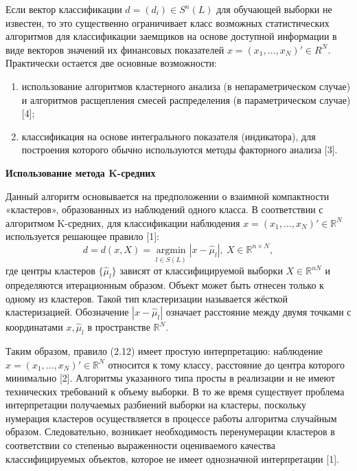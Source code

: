 \documentclass[14pt,a4paper]{extarticle}
\begin{document}
Если вектор классификации $d = (d_{i}) \in S^{n}(L)$ для обучающей выборки не известен, то это существенно ограничивает класс возможных статистических алгоритмов для классификации заемщиков на основе доступной информации в виде векторов значений их финансовых показателей $x = (x_{1},\ldots,x_{N})' \in R^{N}$. Практически остается две основные возможности:
\begin{enumerate}
    \item использование алгоритмов кластерного анализа (в непараметрическом случае) и алгоритмов расщепления смесей распределения (в параметрическом случае) [4];
    \item классификация на основе интегрального показателя (индикатора), для построения которого обычно используются методы факторного анализа [3].
\end{enumerate}

\textbf{Использование метода K-средних}

Данный алгоритм основывается на предположении о взаимной компактности «кластеров», образованных из наблюдений одного класса. В соответствии с алгоритмом K-средних, для классификации наблюдения $x = (x_{1},\ldots,x_{N})' \in \mathbb{R}^{N}$ используется решающее правило [1]:
\begin{equation}
d = d(x,X) = \underset{l \in S(L)}{\operatorname{argmin}} \left| x - \hat{\mu}_{l} \right|,\ X \in \mathbb{R}^{n \times N},
\end{equation}
где центры кластеров $\{\hat{\mu}_{l}\}$ зависят от классифицируемой выборки $X \in \mathbb{R}^{nN}$ и определяются итерационным образом. Объект может быть отнесен только к одному из кластеров. Такой тип кластеризации называется жёсткой кластеризацией. Обозначение $|x - \hat{\mu}_{l}|$ означает расстояние между двумя точками с координатами $x,\hat{\mu}_{l}$ в пространстве $\mathbb{R}^{N}$.

Таким образом, правило (2.12) имеет простую интерпретацию: наблюдение $x = (x_{1},\ldots,x_{N})' \in \mathbb{R}^{N}$ относится к тому классу, расстояние до центра которого минимально [2]. Алгоритмы указанного типа просты в реализации и не имеют технических требований к объему выборки. В то же время существует проблема интерпретации получаемых разбиений выборки на кластеры, поскольку нумерация кластеров осуществляется в процессе работы алгоритма случайным образом. Следовательно, возникает необходимость перенумерации кластеров в соответствии со степенью выраженности оцениваемого качества классифицируемых объектов, которое не имеет однозначной интерпретации [1].
\end{document}
